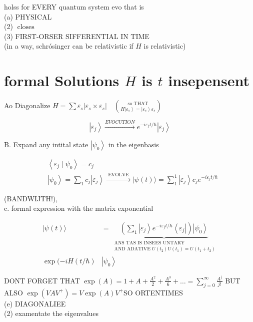 \documentclass[10pt]{article}
\begin{document}
holss for EVERY quantum system evo that is\\
(a) PHYSICAL\\
(2) $\operatorname{closes}$\\
(3) FIRST-ORSER SIFFERENTIAL IN TIME\\
(in a way, schrósinger can be relativistic if $H$ is relativistic)

\section*{formal Solutions $H$ is $t$ insepensent}
Ao Diagonalize $H=\sum \varepsilon_{s}\left|\varepsilon_{s} \times \varepsilon_{s}\right| \quad\binom{\text { so THAT }}{H\left|\varepsilon_{s}\right\rangle=\left|\varepsilon_{s}\right\rangle \varepsilon_{s}}$

$$
\left|\varepsilon_{j}\right\rangle \xrightarrow{E V O C U T I O N} e^{-i \varepsilon_{j} t / \hbar}\left|\varepsilon_{j}\right\rangle
$$

B. Expand any intital state $\left|\psi_{0}\right\rangle$ in the eigenbasis

$$
\begin{aligned}
& \left\langle\varepsilon_{j} \mid \psi_{0}\right\rangle=c_{j} \\
& \left|\psi_{0}\right\rangle=\sum_{1} c_{j}\left|\varepsilon_{j}\right\rangle \xrightarrow{\text { EVOLVE }}|\psi(t)\rangle=\sum_{1}^{1}\left|\varepsilon_{j}\right\rangle c_{j} e^{-i \varepsilon_{j} t / \hbar}
\end{aligned}
$$

(BANDWIJTH!),\\
c. formal expression with the matrix exponential

$$
\begin{aligned}
|\psi(t)\rangle & =\underbrace{\left(\sum_{1}\left|\varepsilon_{j}\right\rangle e^{-i \varepsilon_{j} t / \hbar}\left\langle\varepsilon_{j}\right|\right)\left|\psi_{0}\right\rangle}_{\substack{\text { ANS TAS IS INSEES UNTARY } \\
\text { AND ADATIVE } U\left(t_{2}\right) U\left(t_{1}\right)=U\left(t_{1}+t_{2}\right)}} \\
\exp (-i H(t / \hbar) & \left|\psi_{0}\right\rangle
\end{aligned}
$$

DONT FORGET THAT $\exp (A)=1+A+\frac{A^{2}}{2}+\frac{A^{3}}{6}+\ldots=\sum_{j=0}^{\infty} \frac{A^{j}}{j!}$ BUT ALSO $\exp \left(V A V^{+}\right)=V \exp (A) V^{+}$SO ORTENTIMES\\
(e) DIAGONALIEE\\
(2) examentate the eigenvalues
\end{document}
